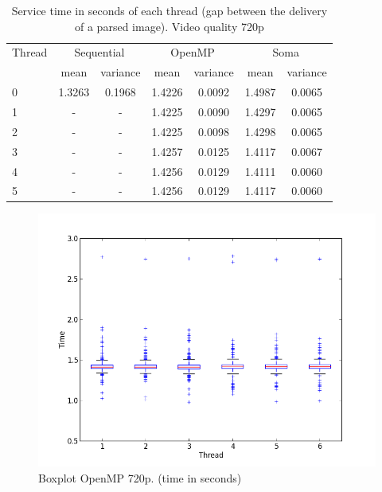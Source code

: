 \documentclass[a4paper,12pt,oneside]{book}
\begin{document}
\begin{table}[H]
\begin{center}
\begin{tabular}{| l || c | c || c | c || c | c |} 
\hline
  Thread & \multicolumn{2}{|c||}{Sequential} & \multicolumn{2}{|c||}{OpenMP} & \multicolumn{2}{|c|}{Soma} \\
\cline{2-7}
& mean & variance & mean & variance & mean & variance \\
\cline{2-7}
\hline
0 & 1.3263 & 0.1968 & 1.4226 & 0.0092 & 1.4987 & 0.0065  \\
\hline
1 & - & - & 1.4225 & 0.0090 & 1.4297 & 0.0065 \\
\hline
2 & - & - & 1.4225 & 0.0098 & 1.4298 & 0.0065 \\
\hline 
3 & - & - & 1.4257 & 0.0125 & 1.4117 & 0.0067 \\
\hline
4 & - & - & 1.4256 & 0.0129 & 1.4111 & 0.0060 \\
\hline
5 & - & - & 1.4256 & 0.0129 & 1.4117 & 0.0060  \\
\hline
\end{tabular}
\caption{Service time in seconds of each thread (gap between the delivery of a parsed image). Video quality 720p}
\label{times2}
\end{center}
\end{table}

\begin{figure}[H]
\centering
\includegraphics[scale=0.55]{omp_time_720txtbox.png}
\caption{Boxplot OpenMP 720p. (time in seconds)}
\label{box720omp}
\end{figure}
\end{document}
